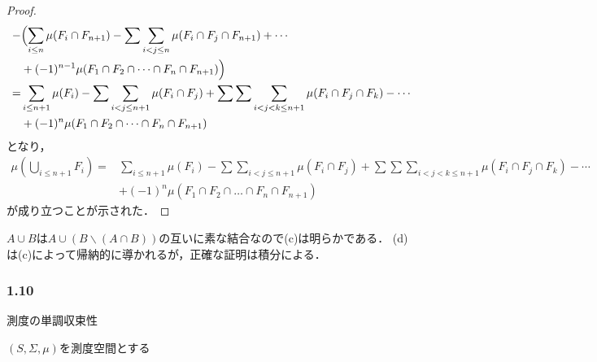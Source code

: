 \documentclass{jsarticle}
\begin{document}
\begin{description}
\begin{proof}
\begin{align}
\begin{split}
                    -  &\Bigl( \sum_{i\leq n}\mu(F_i\cap F_{n+1}) -  \sum\sum_{i<j\leq n}\mu(F_i\cap F_j\cap F_{n+1}) + \cdots \\ &+ (-1)^{n-1}\mu(F_1\cap F_2\cap\dots\cap F_n\cap F_{n+1}) \Bigr) \\ \nonumber
                    = &\sum_{i\leq n+1}\mu(F_i) -  \sum\sum_{i<j\leq n+1}\mu(F_i\cap F_j) + \sum\sum\sum_{i<j<k\leq n+1}\mu(F_i\cap F_j\cap F_k) - \cdots
                    \\ &+ (-1)^{n}\mu(F_1\cap F_2\cap\dots\cap F_n\cap F_{n+1}) \nonumber
                \end{split}
            \end{align}
            となり，
            \begin{equation}
                \begin{split}
                    \mu(\bigcup_{i\leq n+1}F_i)  = &\sum_{i\leq n+1}\mu(F_i) -  \sum\sum_{i<j\leq n+1}\mu(F_i\cap F_j) + \sum\sum\sum_{i<j<k\leq n+1}\mu(F_i\cap F_j\cap F_k) - \cdots
                    \\ &+ (-1)^{n}\mu(F_1\cap F_2\cap\dots\cap F_n\cap F_{n+1}) \nonumber
                \end{split}
            \end{equation}
            が成り立つことが示された．
        \end{proof}
        
\end{description}

$A\cup B$は$A\cup (B\backslash(A\cap B))$の互いに素な結合なので(c)は明らかである．
(d)は(c)によって帰納的に導かれるが，正確な証明は積分による．


\subsubsection*{1.10}
測度の単調収束性

$(S,\Sigma,\mu)$を測度空間とする
\end{document}
